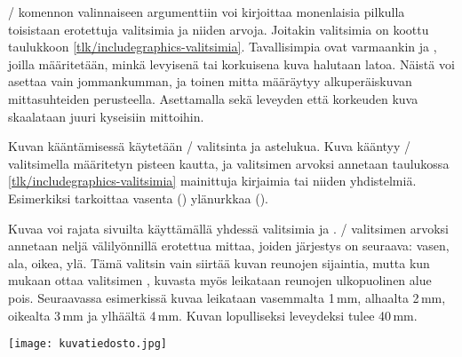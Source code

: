 
\-/ komennon valinnaiseen argumenttiin voi
kirjoittaa monenlaisia pilkulla toisistaan erotettuja valitsimia ja
niiden arvoja. Joitakin valitsimia on koottu taulukkoon
\ref{tlk/includegraphics-valitsimia}. Tavallisimpia ovat varmaankin
 ja , joilla määritetään, minkä levyisenä tai
korkuisena kuva halutaan latoa. Näistä voi asettaa vain jommankumman, ja
toinen mitta määräytyy alkuperäiskuvan mittasuhteiden perusteella.
Asettamalla sekä leveyden että korkeuden kuva skaalataan juuri kyseisiin
mittoihin.

Kuvan kääntämisessä käytetään \-/ valitsinta ja astelukua.
Kuva kääntyy \-/ valitsimella määritetyn pisteen kautta,
ja valitsimen arvoksi annetaan taulukossa
\ref{tlk/includegraphics-valitsimia} mainittuja kirjaimia tai niiden
yhdistelmiä. Esimerkiksi  tarkoittaa vasenta
() ylänurkkaa ().

Kuvaa voi rajata sivuilta käyttämällä yhdessä valitsimia  ja
. \-/ valitsimen arvoksi annetaan neljä
välilyönnillä erotettua mittaa, joiden järjestys on seuraava: vasen,
ala, oikea, ylä. Tämä valitsin vain siirtää kuvan reunojen sijaintia,
mutta kun mukaan ottaa valitsimen , kuvasta myös leikataan
reunojen ulkopuolinen alue pois. Seuraavassa esimerkissä kuvaa leikataan
vasemmalta 1\,mm, alhaalta 2\,mm, oikealta 3\,mm ja ylhäältä 4\,mm.
Kuvan lopulliseksi leveydeksi tulee 40\,mm.

\begin{koodilohkosis}
\texttt{[image: kuvatiedosto.jpg]}
\end{koodilohkosis}

